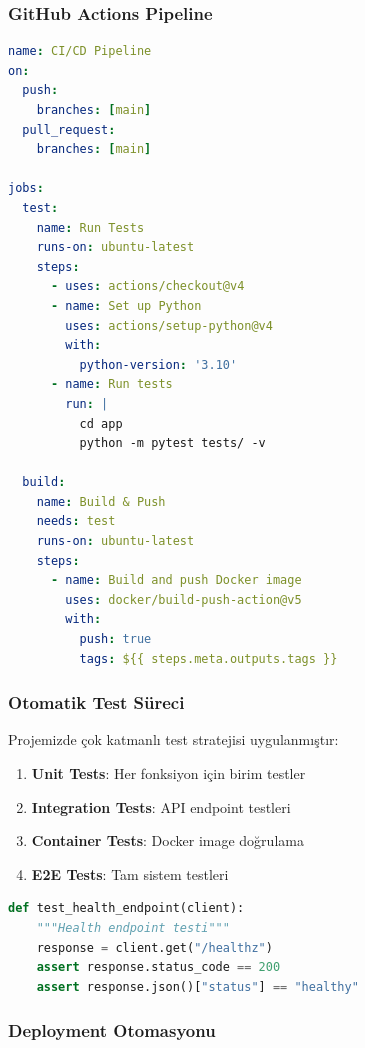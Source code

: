 \documentclass[12pt,a4paper]{article}
\begin{document}
\subsubsection{GitHub Actions Pipeline}

\begin{lstlisting}[language=yaml, caption=CI/CD Pipeline Yapısı]
name: CI/CD Pipeline
on:
  push:
    branches: [main]
  pull_request:
    branches: [main]

jobs:
  test:
    name: Run Tests
    runs-on: ubuntu-latest
    steps:
      - uses: actions/checkout@v4
      - name: Set up Python
        uses: actions/setup-python@v4
        with:
          python-version: '3.10'
      - name: Run tests
        run: |
          cd app
          python -m pytest tests/ -v

  build:
    name: Build & Push
    needs: test
    runs-on: ubuntu-latest
    steps:
      - name: Build and push Docker image
        uses: docker/build-push-action@v5
        with:
          push: true
          tags: ${{ steps.meta.outputs.tags }}
\end{lstlisting}

\subsubsection{Otomatik Test Süreci}

Projemizde çok katmanlı test stratejisi uygulanmıştır:

\begin{enumerate}
    \item \textbf{Unit Tests}: Her fonksiyon için birim testler
    \item \textbf{Integration Tests}: API endpoint testleri
    \item \textbf{Container Tests}: Docker image doğrulama
    \item \textbf{E2E Tests}: Tam sistem testleri
\end{enumerate}

\begin{lstlisting}[language=python, caption=Test Örneği]
def test_health_endpoint(client):
    """Health endpoint testi"""
    response = client.get("/healthz")
    assert response.status_code == 200
    assert response.json()["status"] == "healthy"
\end{lstlisting}

\subsubsection{Deployment Otomasyonu}
\end{document}

